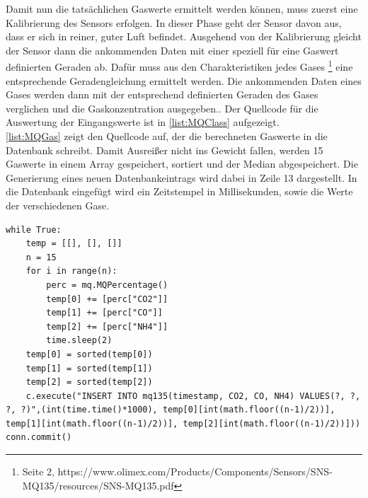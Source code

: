Damit nun die tatsächlichen Gaswerte ermittelt werden können, muss zuerst eine Kalibrierung des Sensors erfolgen. In dieser Phase geht der Sensor davon aus, dass er sich in reiner, guter Luft befindet. Ausgehend von der Kalibrierung gleicht der Sensor dann die ankommenden Daten mit einer speziell für eine Gaswert definierten Geraden ab. Dafür muss aus den Charakteristiken jedes Gases \footnote{Seite 2, https://www.olimex.com/Products/Components/Sensors/SNS-MQ135/resources/SNS-MQ135.pdf} eine entsprechende Geradengleichung ermittelt werden. Die ankommenden Daten eines Gases werden dann mit der entsprechend definierten Geraden des Gases verglichen und die Gaskonzentration ausgegeben.\cite{gas:MQ}. Der Quellcode für die Auswertung der Eingangswerte ist in \autoref{list:MQClass} aufgezeigt.
\\ \autoref{list:MQGas} zeigt den Quellcode auf, der die berechneten Gaswerte in die Datenbank schreibt. Damit Ausreißer nicht ins Gewicht fallen, werden 15 Gaswerte in einem Array gespeichert, sortiert und der Median abgespeichert. Die Generierung eines neuen Datenbankeintrags wird dabei in Zeile 13 dargestellt. In die Datenbank eingefügt wird ein Zeitstempel in Millisekunden, sowie die Werte der verschiedenen Gase.

\begin{lstlisting}[label=list:MQGas, caption={MQ-135 Sensorwerte in DB}]
while True:
	temp = [[], [], []]
	n = 15
	for i in range(n):
		perc = mq.MQPercentage()
		temp[0] += [perc["CO2"]]
		temp[1] += [perc["CO"]]
		temp[2] += [perc["NH4"]]
		time.sleep(2)
	temp[0] = sorted(temp[0])
	temp[1] = sorted(temp[1])
	temp[2] = sorted(temp[2])
	c.execute("INSERT INTO mq135(timestamp, CO2, CO, NH4) VALUES(?, ?, ?, ?)",(int(time.time()*1000), temp[0][int(math.floor((n-1)/2))], temp[1][int(math.floor((n-1)/2))], temp[2][int(math.floor((n-1)/2))]))
conn.commit()
\end{lstlisting}


